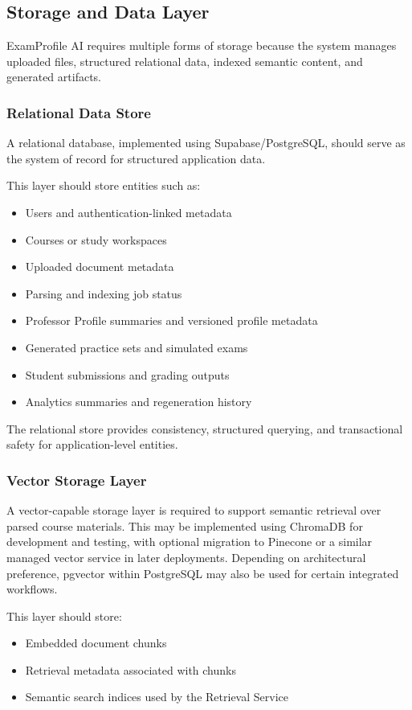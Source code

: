 \documentclass[11pt]{article}
\begin{document}
\subsection{Storage and Data Layer}
ExamProfile AI requires multiple forms of storage because the system manages uploaded files, structured relational data, indexed semantic content, and generated artifacts.

\subsubsection{Relational Data Store}
A relational database, implemented using Supabase/PostgreSQL, should serve as the system of record for structured application data.

This layer should store entities such as:
\begin{itemize}
\item Users and authentication-linked metadata
\item Courses or study workspaces
\item Uploaded document metadata
\item Parsing and indexing job status
\item Professor Profile summaries and versioned profile metadata
\item Generated practice sets and simulated exams
\item Student submissions and grading outputs
\item Analytics summaries and regeneration history
\end{itemize}

The relational store provides consistency, structured querying, and transactional safety for application-level entities.

\subsubsection{Vector Storage Layer}
A vector-capable storage layer is required to support semantic retrieval over parsed course materials. This may be implemented using ChromaDB for development and testing, with optional migration to Pinecone or a similar managed vector service in later deployments. Depending on architectural preference, pgvector within PostgreSQL may also be used for certain integrated workflows.

This layer should store:
\begin{itemize}
\item Embedded document chunks
\item Retrieval metadata associated with chunks
\item Semantic search indices used by the Retrieval Service
\end{itemize}
\end{document}
